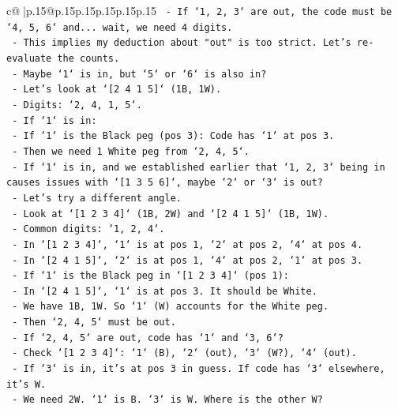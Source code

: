 \documentclass{article}
\begin{document}
{\begin{supertabular}{c@{$\;$}|p{.15\linewidth}@{}p{.15\linewidth}p{.15\linewidth}p{.15\linewidth}p{.15\linewidth}p{.15\linewidth}}
{{{\texttt{    {-} If `1, 2, 3` are out, the code must be `4, 5, 6` and... wait, we need 4 digits.} \\
\texttt{    {-} This implies my deduction about "out" is too strict. Let's re{-}evaluate the counts.} \\
\texttt{    {-} Maybe `1` is in, but `5` or `6` is also in?} \\
\texttt{    {-} Let's look at `{[}2 4 1 5{]}` (1B, 1W).} \\
\texttt{        {-} Digits: `2, 4, 1, 5`.} \\
\texttt{        {-} If `1` is in:} \\
\texttt{            {-} If `1` is the Black peg (pos 3): Code has `1` at pos 3.} \\
\texttt{            {-} Then we need 1 White peg from `2, 4, 5`.} \\
\texttt{            {-} If `1` is in, and we established earlier that `1, 2, 3` being in causes issues with `{[}1 3 5 6{]}`, maybe `2` or `3` is out?} \\
\texttt{            {-} Let's try a different angle.} \\
\texttt{            {-} Look at `{[}1 2 3 4{]}` (1B, 2W) and `{[}2 4 1 5{]}` (1B, 1W).} \\
\texttt{            {-} Common digits: `1, 2, 4`.} \\
\texttt{            {-} In `{[}1 2 3 4{]}`, `1` is at pos 1, `2` at pos 2, `4` at pos 4.} \\
\texttt{            {-} In `{[}2 4 1 5{]}`, `2` is at pos 1, `4` at pos 2, `1` at pos 3.} \\
\texttt{            {-} If `1` is the Black peg in `{[}1 2 3 4{]}` (pos 1):} \\
\texttt{                {-} In `{[}2 4 1 5{]}`, `1` is at pos 3. It should be White.} \\
\texttt{                {-} We have 1B, 1W. So `1` (W) accounts for the White peg.} \\
\texttt{                {-} Then `2, 4, 5` must be out.} \\
\texttt{                {-} If `2, 4, 5` are out, code has `1` and `3, 6`?} \\
\texttt{                {-} Check `{[}1 2 3 4{]}`: `1` (B), `2` (out), `3` (W?), `4` (out).} \\
\texttt{                {-} If `3` is in, it's at pos 3 in guess. If code has `3` elsewhere, it's W.} \\
\texttt{                {-} We need 2W. `1` is B. `3` is W. Where is the other W?} \\
}}}
\end{supertabular}}
\end{document}
